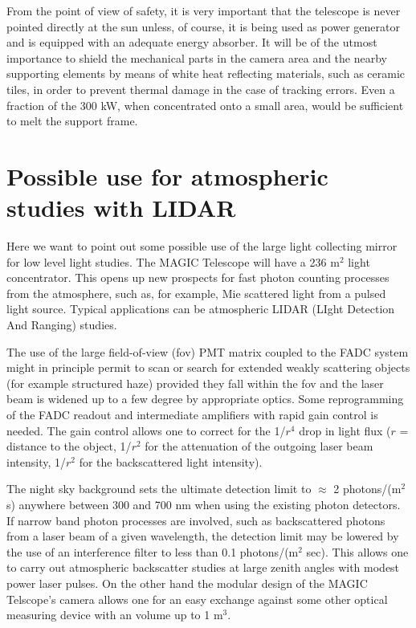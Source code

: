 From the point of view of safety, it is very important that the telescope is
never pointed directly at the sun unless, of course, it is being used as
power generator and is equipped with an adequate energy absorber. It will be
of the utmost importance to shield the mechanical parts in the camera area
and the nearby supporting elements by means of white heat reflecting
materials, such as ceramic tiles, in order to prevent thermal damage in the
case of tracking errors. Even a fraction of the 300 kW, when concentrated
onto a small area, would be sufficient to melt the support frame.

\section{Possible use for atmospheric studies with LIDAR}

Here we want to point out some possible use of the large light collecting mirror
for low level light studies. The MAGIC Telescope will have a 236 m$^2$ light
concentrator.
This opens up new prospects for fast photon counting processes from the
atmosphere, such as, for example, Mie scattered light from a pulsed light source. 
Typical applications can be atmospheric LIDAR
(LIght Detection And Ranging) studies.

The use of the large field-of-view (fov) PMT matrix coupled
to the FADC system might in principle permit to scan or
search for extended weakly scattering objects (for example
structured haze) provided they fall within the fov and the
laser beam is widened up to a few degree by appropriate
optics.  Some reprogramming of the FADC readout and
intermediate amplifiers with rapid gain control is
needed. The gain control allows one to correct for the
1/$r^4$ drop in light flux ($r$ = distance to the object,
1/$r^2$ for the attenuation of the outgoing laser beam
intensity, 1/$r^2$ for the backscattered light intensity).

The night sky background sets the ultimate detection limit
to $\approx$ 2 photons/(m$^2$ s) anywhere between 300 and
700 nm when using the existing photon detectors. If narrow
band photon processes are involved, such as backscattered
photons from a laser beam of a given wavelength, the
detection limit may be lowered by the use of an interference
filter to less than 0.1 photons/(m$^2$ sec). This allows one
to carry out atmospheric backscatter studies at large zenith
angles with modest power laser pulses.  On the other hand
the modular design of the MAGIC Telscope's camera allows one
for an easy exchange against some other optical measuring
device with an volume up to 1 m$^3$.

